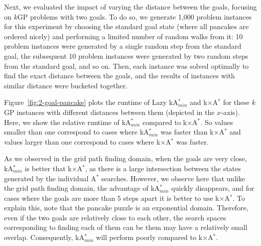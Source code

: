 \documentclass{aicom2e}
\newcommand{\kgs}{$k$GP}
\newcommand{\astar}{A$^*$}
\newcommand{\kastarmin}{kA$^*_{min}$}
\newcommand{\kxastar}{k$\times$A$^*$}
\begin{document}
Next, we evaluated the impact of varying the distance between the goals,
focusing on \kgs{} problems with two goals. To do so, we generate 1,000 problem
instances for this experiment by choosing the standard goal state (where all
pancakes are ordered nicely) and performing a limited number of random walks
from it: 10 problem instances were generated by a single random step from the
standard goal, the subsequent 10 problem instances were generated by two random
steps from the standard goal, and so on. Then, each instance was solved
optimally to find the exact distance between the goals, and the results of
instances with similar distance were bucketed together.




Figure~\ref{fig:2-goal-pancake} plots the runtime of Lazy \kastarmin{} and
\kxastar{} for these \kgs{} instances with different distances between them
(depicted in the $x$-axis). Here, we show the relative runtime of \kastarmin{}
compared to \kxastar{}. So values smaller than one correspond to cases where
\kastarmin{} was faster than \kxastar{} and values larger than one correspond
to cases where \kxastar{} was faster.

As we observed in the grid path finding domain, when the goals are very close,
\kastarmin{} is better that \kxastar{}, as there is a large intersection
between the states generated by the individual \astar{} searches. However, we
observe here that unlike the grid path finding domain, the advantage of
\kastarmin{} quickly disappears, and for cases where the goals are more than 5
steps apart it is better to use \kxastar{}. To explain this, note that the
pancake puzzle is an exponential domain. Therefore, even if the two goals are
relatively close to each other, the search spaces corresponding to finding each
of them can be them may have a relatively small overlap. Consequently,
\kastarmin{} will perform poorly compared to \kxastar{}.

\end{document}
